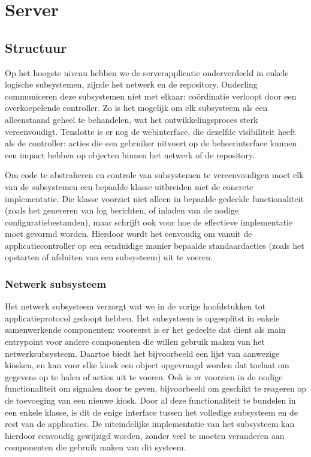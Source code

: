 \part{Server}
\label{server}

\chapter{Structuur}
\label{server:structuur}

Op het hoogste niveau hebben we de serverapplicatie onderverdeeld in enkele logische subsystemen, zijnde het netwerk en de repository. Onderling communiceren deze subsystemen niet met elkaar: coördinatie verloopt door een overkoepelende controller. Zo is het mogelijk om elk subsysteem als een alleenstaand geheel te behandelen, wat het ontwikkelingsproces sterk vereenvoudigt. Tenslotte is er nog de webinterface, die dezelfde visibiliteit heeft als de controller: acties die een gebruiker uitvoert op de beheerinterface kunnen een impact hebben op objecten binnen het netwerk of de repository.

Om code te abstraheren en controle van subsystemen te vereenvoudigen moet elk van de subsystemen een bepaalde klasse uitbreiden met de concrete implementatie. Die klasse voorziet niet alleen in bepaalde gedeelde functionaliteit (zoals het genereren van log berichten, of inladen van de nodige configuratiebestanden), maar schrijft ook voor hoe de effectieve implementatie moet gevormd worden. Hierdoor wordt het eenvoudig om vanuit de applicatiecontroller op een eenduidige manier bepaalde standaardacties (zoals het opstarten of afsluiten van een subsysteem) uit te voeren.

\section{Netwerk subsysteem}
\label{server:structuur:netwerk}

Het netwerk subsysteem verzorgt wat we in de vorige hoofdstukken tot applicatieprotocol gedoopt hebben. Het subsysteem is opgesplitst in enkele samenwerkende componenten: vooreerst is er het gedeelte dat dient als main entrypoint voor andere componenten die willen gebruik maken van het netwerksubsysteem. Daartoe biedt het bijvoorbeeld een lijst van aanwezige kiosken, en kan voor elke kiosk een object opgevraagd worden dat toelaat om gegevens op te halen of acties uit te voeren. Ook is er voorzien in de nodige functionaliteit om signalen door te geven, bijvoorbeeld om geschikt te reageren op de toevoeging van een nieuwe kiosk.
Door al deze functionaliteit te bundelen in een enkele klasse, is dit de enige interface tussen het volledige subsysteem en de rest van de applicaties. De uiteindelijke implementatie van het subsysteem kan hierdoor eenvoudig gewijzigd worden, zonder veel te moeten veranderen aan componenten die gebruik maken van dit systeem.

